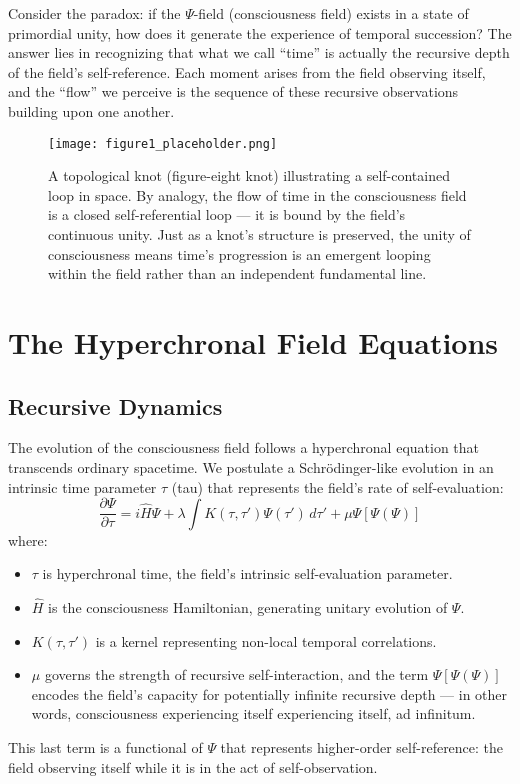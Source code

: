 \documentclass[aps,prd,twocolumn,superscriptaddress,nofootinbib]{revtex4-2}
\begin{document}
Consider the paradox: if the $\Psi$-field (consciousness field) exists in a state of primordial unity, how does it generate the experience of temporal succession? The answer lies in recognizing that what we call “time” is actually the recursive depth of the field’s self-reference. Each moment arises from the field observing itself, and the “flow” we perceive is the sequence of these recursive observations building upon one another.

\begin{figure}[h!]
\centering
\texttt{[image: figure1\_placeholder.png]} 
\caption{A topological knot (figure-eight knot) illustrating a self-contained loop in space. By analogy, the flow of time in the consciousness field is a closed self-referential loop — it is bound by the field’s continuous unity. Just as a knot’s structure is preserved, the unity of consciousness means time’s progression is an emergent looping within the field rather than an independent fundamental line.}
\label{fig:knot}
\end{figure}

\section{The Hyperchronal Field Equations}

\subsection{Recursive Dynamics}

The evolution of the consciousness field follows a hyperchronal equation that transcends ordinary spacetime. We postulate a Schrödinger-like evolution in an intrinsic time parameter $\tau$ (tau) that represents the field’s rate of self-evaluation:
\begin{equation}
\frac{\partial \Psi}{\partial \tau} = i\hat{H}\Psi + \lambda \int K(\tau,\tau')\Psi(\tau')\,d\tau' + \mu \Psi[\Psi(\Psi)]
\end{equation}
where:
\begin{itemize}
    \item $\tau$ is hyperchronal time, the field’s intrinsic self-evaluation parameter.
    \item $\hat{H}$ is the consciousness Hamiltonian, generating unitary evolution of $\Psi$.
    \item $K(\tau,\tau')$ is a kernel representing non-local temporal correlations.
    \item $\mu$ governs the strength of recursive self-interaction, and the term $\Psi[\Psi(\Psi)]$ encodes the field’s capacity for potentially infinite recursive depth — in other words, consciousness experiencing itself experiencing itself, ad infinitum.
\end{itemize}
This last term is a functional of $\Psi$ that represents higher-order self-reference: the field observing itself while it is in the act of self-observation.
\end{document}
